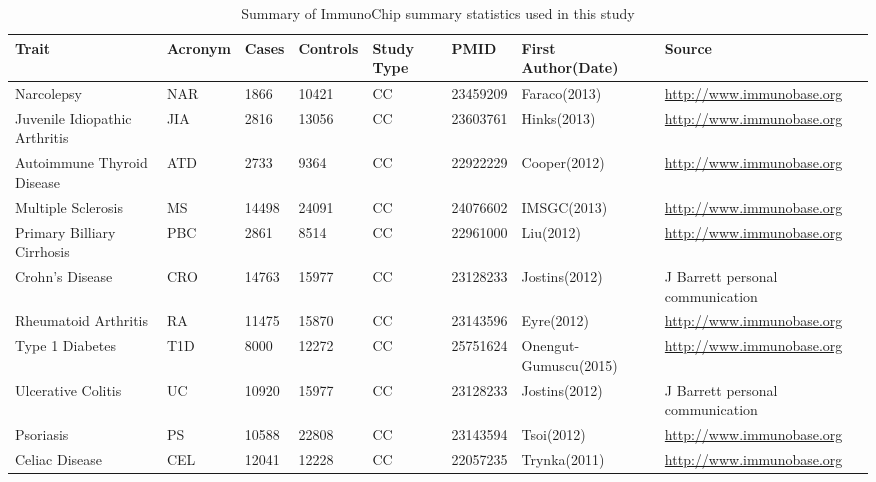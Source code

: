 \begin{table}[ht]
\caption{Summary of ImmunoChip summary statistics used in this study}
\label{tab:icm}
\begin{tabular}{| L{5cm} | C{1.5cm} | C{1cm} | C{1.5cm} | C{1.5cm} | C{1.5cm} | L{2.5cm} | L{4cm} |}
\hline
Trait & Acronym & Cases & Controls & Study Type & PMID & First Author(Date) &  Source \\ \hline \hline  
Narcolepsy & NAR &  1866 & 10421 & CC & 23459209 & Faraco(2013) & \url{http://www.immunobase.org} \\ 
Juvenile Idiopathic Arthritis & JIA & 2816 & 13056 & CC & 23603761 & Hinks(2013) & \url{http://www.immunobase.org}  \\ 
Autoimmune Thyroid Disease & ATD &  2733 & 9364 & CC & 22922229 & Cooper(2012) & \url{http://www.immunobase.org} \\ 
Multiple Sclerosis & MS & 14498 & 24091 & CC & 24076602 & IMSGC(2013) & \url{http://www.immunobase.org} \\ 
Primary Billiary Cirrhosis & PBC &  2861 & 8514 & CC & 22961000 & Liu(2012) & \url{http://www.immunobase.org}\\ 
Crohn's Disease & CRO &  14763 & 15977 & CC & 23128233 & Jostins(2012) & J Barrett personal communication \\ 
Rheumatoid Arthritis & RA &  11475 & 15870 & CC & 23143596 & Eyre(2012) & \url{http://www.immunobase.org} \\ 
Type 1 Diabetes & T1D &  8000 & 12272 & CC & 25751624 & Onengut-Gumuscu(2015) & \url{http://www.immunobase.org}\\ 
Ulcerative Colitis & UC &  10920 & 15977 & CC & 23128233  & Jostins(2012) & J Barrett personal communication \\ 
Psoriasis & PS &  10588 & 22808 & CC & 23143594 & Tsoi(2012) & \url{http://www.immunobase.org}\\ 
Celiac Disease & CEL &  12041 & 12228 & CC & 22057235 & Trynka(2011) & \url{http://www.immunobase.org} \\ 
\hline
\end{tabular}
\end{table}